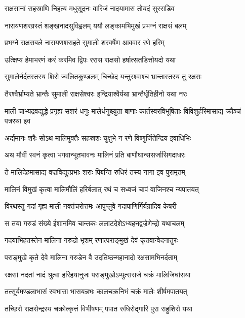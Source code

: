 \twolineshloka
{राक्षसानां सहस्राणि निहत्य मधुसूदनः}
{वारिजं नादयामास तोयदं सुरराडिव} %

\twolineshloka
{नारायणशरग्रस्तं शङ्खनादसुविह्वलम्}
{ययौ लङ्कामभिमुखं प्रभग्नं राक्षसं बलम्} %

\twolineshloka
{प्रभग्ने राक्षसबले नारायणशराहते}
{सुमाली शरवर्षेण आववार रणे हरिम्} %

\twolineshloka
{उत्क्षिप्य हेमाभरणं करं करमिव द्विपः}
{ररास राक्षसो हर्षात्सतडित्तोयदो यथा} %

\twolineshloka
{सुमालेर्नर्दतस्तस्य शिरो ज्वलितकुण्डलम्}
{चिच्छेद यन्तुरश्वाश्च भ्रान्तास्तस्य तु रक्षसः} %

\twolineshloka
{तैरश्वैर्भ्राम्यते भ्रान्तैः सुमाली राक्षसेश्वरः}
{इन्द्रियाश्वैर्यथा भ्रान्तैर्धृतिहीनो यथा नरः} %

\threelineshloka
{माली चाभ्यद्रवद्युद्धे प्रगृह्य सशरं धनुः}
{मालेर्धनुश्च्युता बाणाः कार्तस्वरविभूषिताः}
{विविशुर्हरिमासाद्य क्रौञ्चं पत्ररथा इव} %

\twolineshloka
{अर्द्यमानः शरैः सोऽथ मालिमुक्तैः सहस्रशः}
{चुक्षुभे न रणे विष्णुर्जितेन्द्रिय इवाधिभिः} %

\twolineshloka
{अथ मौर्वी स्वनं कृत्वा भगवान्भूतभावनः}
{मालिनं प्रति बाणौघान्ससर्जासिगदाधरः} %

\twolineshloka
{ते मालिदेहमासाद्य वज्रविद्युत्प्रभाः शराः}
{पिबन्ति रुधिरं तस्य नागा इव पुरामृतम्} %

\twolineshloka
{मालिनं विमुखं कृत्वा मालिमौलिं हरिर्बलात्}
{रथं च सध्वजं चापं वाजिनश्च न्यपातयत्} %

\twolineshloka
{विरथस्तु गदां गृह्य माली नक्तंचरोत्तमः}
{आपुप्लुवे गदापाणिर्गिर्यग्रादिव केषरी} %

\twolineshloka
{स तया गरुडं संख्ये ईशानमिव चान्तकः}
{ललाटदेशेऽभ्यहनद्वज्रेणेन्द्रो यथाचलम्} %

\twolineshloka
{गदयाभिहतस्तेन मालिना गरुडो भृशम्}
{रणात्पराङ्मुखं देवं कृतवान्वेदनातुरः} %

\twolineshloka
{पराङ्मुखे कृते देवे मालिना गरुडेन वै}
{उदतिष्ठन्महानादो रक्षसामभिनर्दताम्} %

\twolineshloka
{रक्षसां नदतां नादं श्रुत्वा हरिहयानुजः}
{पराङ्मुखोऽप्युत्ससर्ज चक्रं मालिजिघांसया} %

\twolineshloka
{तत्सूर्यमण्डलाभासं स्वभासा भासयन्नभः}
{कालचक्रनिभं चक्रं मालेः शीर्षमपातयत्} %

\twolineshloka
{तच्छिरो राक्षसेन्द्रस्य चक्रोत्कृत्तं विभीषणम्}
{पपात रुधिरोद्गारि पुरा राहुशिरो यथा} %

